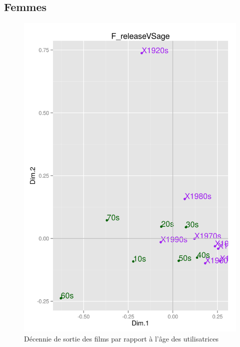 \documentclass[11pt]{article}
\begin{document}
\subsection{Femmes}
\begin{figure}[htd]
\centering
\includegraphics[scale=0.65]{./images/F_releaseVSage}
\caption{Décennie de sortie des films par rapport à l'âge des utilisatrices}
\end{figure}

\pagebreak
\end{document}
